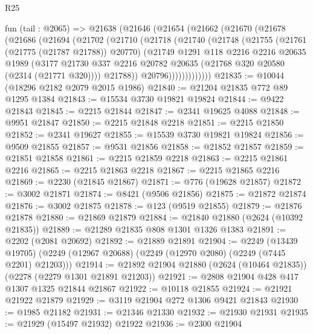 \begin{lexlean}{R25}
\begin{coremodule}
    fun (tail : @2065) =>
    @21638
      (@21646
        (@21654
          (@21662
            (@21670
              (@21678
                (@21686
                  (@21694
                    (@21702
                      (@21710
                        (@21718
                          (@21740
                            (@21748
                              (@21755
                                (@21761 (@21775 (@21787 @21788)) @20770)
                                (@21749
                                  @1291
                                  @118
                                  @2216
                                  @2216
                                  @20635
                                  @1989
                                  (@3177
                                    @21730
                                    @337
                                    @2216
                                    @20782
                                    @20635
                                    (@21768 @320 @20580 (@2314 (@21771 @320))))
                                  @21788))
                              @20796)))))))))))))
@21835 := @10044 (@18296 @2182 @2079 @2015 @1986)
@21840 := @21204 @21835 @772 @89 @1295 @1384
@21843 := @15534 @3730 @19821 @19824
@21844 := @9422 @21843
@21845 := @2215 @21844
@21847 := @2341 @19625 @4088
@21848 := @9951 @21847
@21850 := @2215 @21848 @2218
@21851 := @2215 @21850
@21852 := @2341 @19627
@21855 := @15539 @3730 @19821 @19824
@21856 := @9509 @21855
@21857 := @9531 @21856
@21858 := @21852 @21857
@21859 := @21851 @21858
@21861 := @2215 @21859 @2218
@21863 := @2215 @21861 @2216
@21865 := @2215 @21863 @2218
@21867 := @2215 @21865 @2216
@21869 := @2230 (@21845 @21867)
@21871 := @776 (@19628 @21857)
@21872 := @3002 @21871
@21874 := @8421 (@9506 @21856)
@21875 := @21872 @21874
@21876 := @3002 @21875
@21878 := @123 (@9519 @21855)
@21879 := @21876 @21878
@21880 := @21869 @21879
@21884 := @21840 @21880 (@2624 (@10392 @21835))
@21889 := @21289 @21835 @808 @1301 @1326 @1383
@21891 := @2202 (@2081 @20692)
@21892 := @21889 @21891
@21904 := @2249
    (@13439 @19705)
    (@2249 (@12967 @20688) (@2249 (@12970 @2080) (@2249 (@7445 @2201) @21203)))
@21914 := @21892 @21904 @21880 (@2624 (@10464 @21835)) (@2278 (@2279 @1301 @21891 @21203))
@21921 := @2808 @21904 @428 @417 @1307 @1325 @21844 @21867
@21922 := @10118 @21855
@21924 := @21921 @21922 @21879
@21929 := @3119 @21904 @272 @1306 @9421 @21843
@21930 := @1985 @21182
@21931 := @21346 @21330
@21932 := @21930 @21931
@21935 := @21929 (@15497 @21932) @21922
@21936 := @2300 @21904

\end{coremodule}
\end{lexlean}
